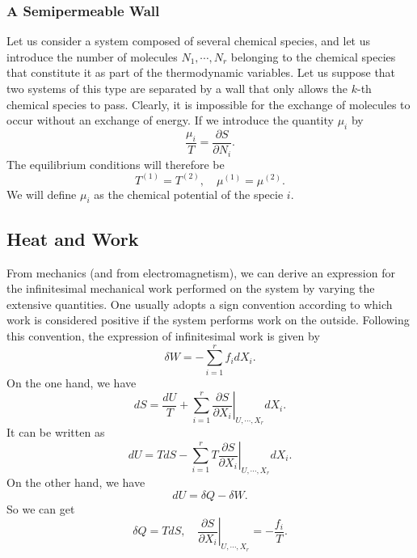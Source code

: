 \subsubsection{A Semipermeable Wall}
Let us consider a system composed of several chemical species, and let us introduce the number of molecules $N_1, \cdots, N_{r}$ belonging to the chemical species that constitute it as part of the thermodynamic variables. Let us suppose that two systems of this type are separated by a wall that only allows the $k$-th chemical species to pass. Clearly, it is impossible for the exchange of molecules to occur without an exchange of energy. If we introduce the quantity $\mu_i$ by
\[\frac{\mu_i}{T} =  \frac{\partial S}{\partial N_i} .\]
The equilibrium conditions will therefore be
\[T^{(1)} = T^{(2)} , \quad \mu^{(1)} = \mu^{(2)}.\]
We will define $\mu_i$ as the chemical potential of the specie $i$.

\subsection{Heat and Work}
From mechanics (and from electromagnetism), we can derive an expression for the infinitesimal mechanical work performed on the system by varying the extensive quantities. One usually adopts a sign convention according to which work is considered positive if the system performs work on the outside. Following this convention, the expression of infinitesimal work is given by
\[\delta W  =  -\sum_{i = 1}^{r} f_i dX_i.\]
On the one hand, we have
\[dS = \frac{dU}{T} + \sum_{i = 1}^{r} \left. \frac{\partial S}{\partial X_i} \right|_{U,\cdots,X_r} dX_i.\]
It can be written as
\[dU = TdS - \sum_{i = 1}^{r} \left. T \frac{\partial S}{\partial X_i} \right|_{U,\cdots,X_r} dX_i.\]
On the other hand, we have
\[dU = \delta Q - \delta W.\]
So we can get
\[\delta Q = TdS , \quad \left. \frac{\partial S}{\partial X_i} \right|_{U,\cdots,X_r} = - \frac{f_i}{T}.\]


